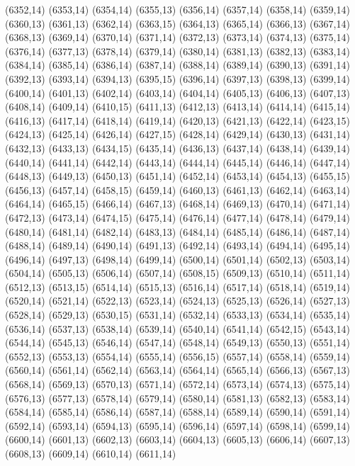 (6352,14)
(6353,14)
(6354,14)
(6355,13)
(6356,14)
(6357,14)
(6358,14)
(6359,14)
(6360,13)
(6361,13)
(6362,14)
(6363,15)
(6364,13)
(6365,14)
(6366,13)
(6367,14)
(6368,13)
(6369,14)
(6370,14)
(6371,14)
(6372,13)
(6373,14)
(6374,13)
(6375,14)
(6376,14)
(6377,13)
(6378,14)
(6379,14)
(6380,14)
(6381,13)
(6382,13)
(6383,14)
(6384,14)
(6385,14)
(6386,14)
(6387,14)
(6388,14)
(6389,14)
(6390,13)
(6391,14)
(6392,13)
(6393,14)
(6394,13)
(6395,15)
(6396,14)
(6397,13)
(6398,13)
(6399,14)
(6400,14)
(6401,13)
(6402,14)
(6403,14)
(6404,14)
(6405,13)
(6406,13)
(6407,13)
(6408,14)
(6409,14)
(6410,15)
(6411,13)
(6412,13)
(6413,14)
(6414,14)
(6415,14)
(6416,13)
(6417,14)
(6418,14)
(6419,14)
(6420,13)
(6421,13)
(6422,14)
(6423,15)
(6424,13)
(6425,14)
(6426,14)
(6427,15)
(6428,14)
(6429,14)
(6430,13)
(6431,14)
(6432,13)
(6433,13)
(6434,15)
(6435,14)
(6436,13)
(6437,14)
(6438,14)
(6439,14)
(6440,14)
(6441,14)
(6442,14)
(6443,14)
(6444,14)
(6445,14)
(6446,14)
(6447,14)
(6448,13)
(6449,13)
(6450,13)
(6451,14)
(6452,14)
(6453,14)
(6454,13)
(6455,15)
(6456,13)
(6457,14)
(6458,15)
(6459,14)
(6460,13)
(6461,13)
(6462,14)
(6463,14)
(6464,14)
(6465,15)
(6466,14)
(6467,13)
(6468,14)
(6469,13)
(6470,14)
(6471,14)
(6472,13)
(6473,14)
(6474,15)
(6475,14)
(6476,14)
(6477,14)
(6478,14)
(6479,14)
(6480,14)
(6481,14)
(6482,14)
(6483,13)
(6484,14)
(6485,14)
(6486,14)
(6487,14)
(6488,14)
(6489,14)
(6490,14)
(6491,13)
(6492,14)
(6493,14)
(6494,14)
(6495,14)
(6496,14)
(6497,13)
(6498,14)
(6499,14)
(6500,14)
(6501,14)
(6502,13)
(6503,14)
(6504,14)
(6505,13)
(6506,14)
(6507,14)
(6508,15)
(6509,13)
(6510,14)
(6511,14)
(6512,13)
(6513,15)
(6514,14)
(6515,13)
(6516,14)
(6517,14)
(6518,14)
(6519,14)
(6520,14)
(6521,14)
(6522,13)
(6523,14)
(6524,13)
(6525,13)
(6526,14)
(6527,13)
(6528,14)
(6529,13)
(6530,15)
(6531,14)
(6532,14)
(6533,13)
(6534,14)
(6535,14)
(6536,14)
(6537,13)
(6538,14)
(6539,14)
(6540,14)
(6541,14)
(6542,15)
(6543,14)
(6544,14)
(6545,13)
(6546,14)
(6547,14)
(6548,14)
(6549,13)
(6550,13)
(6551,14)
(6552,13)
(6553,13)
(6554,14)
(6555,14)
(6556,15)
(6557,14)
(6558,14)
(6559,14)
(6560,14)
(6561,14)
(6562,14)
(6563,14)
(6564,14)
(6565,14)
(6566,13)
(6567,13)
(6568,14)
(6569,13)
(6570,13)
(6571,14)
(6572,14)
(6573,14)
(6574,13)
(6575,14)
(6576,13)
(6577,13)
(6578,14)
(6579,14)
(6580,14)
(6581,13)
(6582,13)
(6583,14)
(6584,14)
(6585,14)
(6586,14)
(6587,14)
(6588,14)
(6589,14)
(6590,14)
(6591,14)
(6592,14)
(6593,14)
(6594,13)
(6595,14)
(6596,14)
(6597,14)
(6598,14)
(6599,14)
(6600,14)
(6601,13)
(6602,13)
(6603,14)
(6604,13)
(6605,13)
(6606,14)
(6607,13)
(6608,13)
(6609,14)
(6610,14)
(6611,14)
